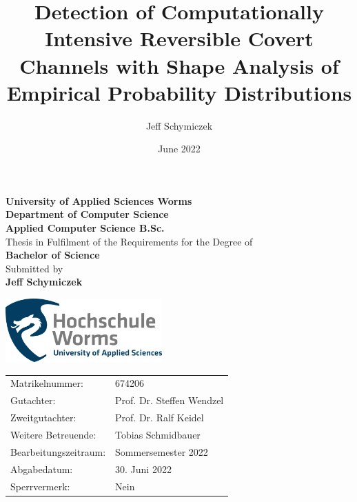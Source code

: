 \documentclass[12pt,a4paper,automark, toc=bib]{scrreprt}
\author{Jeff Schymiczek}
\title{Detection of Computationally Intensive Reversible Covert Channels with Shape Analysis of Empirical Probability Distributions}
\date{June 2022}
\makeatletter
\theoremstyle{definition}
\let\inserttitle\@title
\makeatother
\begin{document}
	\begin{titlepage}
		\centering
		\vfill
		{\bfseries
			\Large
			University of Applied Sciences Worms \\
			\large
			Department of Computer Science\\
			Applied Computer Science B.Sc.
			\vskip1cm
			\huge
			\inserttitle \\
			\vskip1cm
			\normalsize
		}
		Thesis in Fulfilment of the Requirements for the Degree of \\
		\Large
		\textbf{Bachelor of Science}\\
		\normalsize
		\vskip1cm
		Submitted by \\
		\Large
		\textbf{Jeff Schymiczek} \\
		\vskip2cm
		  	
		 \normalsize
		\vfill
		\includegraphics[width=6cm]{figures/FH_Worms.png}
		\vfill
		\begin{center}
		\begin{tabular}[H]{ll}
			Matrikelnummer: & 674206\\
			Gutachter: & Prof. Dr. Steffen Wendzel\\
			Zweitgutachter: & Prof. Dr. Ralf Keidel \\
			Weitere Betreuende: & Tobias Schmidbauer\\
			Bearbeitungszeitraum: & Sommersemester 2022 \\
			Abgabedatum: & 30. Juni 2022 \\
			Sperrvermerk: & Nein
		\end{tabular}
		\end{center}
		\vfill
		\vfill
	\end{titlepage}
\end{document}
